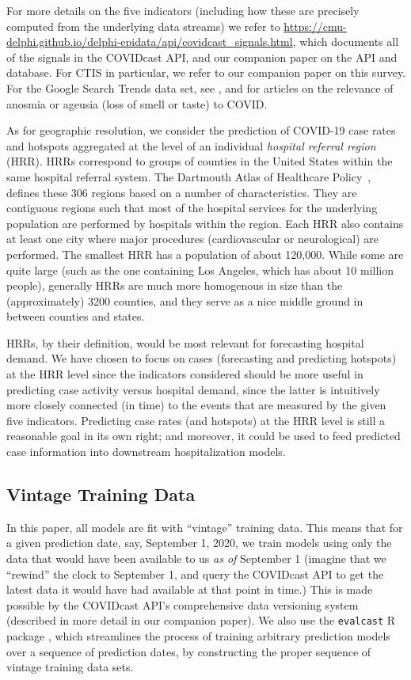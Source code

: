 \documentclass[9pt,twocolumn,twoside,lineno]{pnas-new}
\begin{document}
For more details on the five indicators (including how these are precisely
computed from the underlying data streams) we refer to
\url{https://cmu-delphi.github.io/delphi-epidata/api/covidcast_signals.html},
which documents all of the signals in the COVIDcast API, and our companion paper
on the API and database. For CTIS in particular, we refer to our companion paper
on this survey. For the Google Search Trends data set, see
\cite{GoogleSymptoms}, and \cite{Klopfen:2020, Vaira:2020} for articles on the
relevance of anosmia or ageusia (loss of smell or taste) to COVID.

As for geographic resolution, we consider the prediction of COVID-19 case rates
and hotspots aggregated at the level of an individual \textit{hospital referral
  region} (HRR). HRRs correspond to groups of counties in the United States
within the same hospital referral system. The Dartmouth Atlas of Healthcare 
Policy~\cite{DartmouthHRR}, defines these 306 regions based on a number of
characteristics. They are contiguous regions such that most of the hospital
services for the underlying population are performed by hospitals within the
region. Each HRR also contains at least one city where major procedures
(cardiovascular or neurological) are performed. The smallest HRR has a
population of about 120,000. While some are quite large (such as the one
containing Los Angeles, which has about 10 million people), generally HRRs 
are much more homogenous in size than the (approximately) 3200 counties,  
and they serve as a nice middle ground in between counties and states.  

HRRs, by their definition, would be most relevant for forecasting hospital
demand.  We have chosen to focus on cases (forecasting and predicting
hotspots) at the HRR level since the indicators considered should be more 
useful in predicting case activity versus hospital demand, since the latter is
intuitively more closely connected (in time) to the events that are measured by
the given five indicators. Predicting case rates (and hotspots) at the HRR level
is still a reasonable goal in its own right; and moreover, it could be used to
feed predicted case information into downstream hospitalization models.

\subsection{Vintage Training Data}

In this paper, all models are fit with ``vintage'' training data. This means
that for a given prediction date, say, September 1, 2020, we train models 
using only the data that would have been available to us \textit{as of}
September 1 (imagine that we ``rewind'' the clock to September 1, and query the
COVIDcast API to get the latest data it would have had available at that point
in time.)  This is made possible by the COVIDcast API's comprehensive data  
versioning system (described in more detail in our companion paper).  We also
use the \texttt{evalcast} R package \cite{EvalcastR}, which streamlines the
process of training arbitrary prediction models over a sequence of prediction
dates, by constructing the proper sequence of vintage training data sets.   
\end{document}

